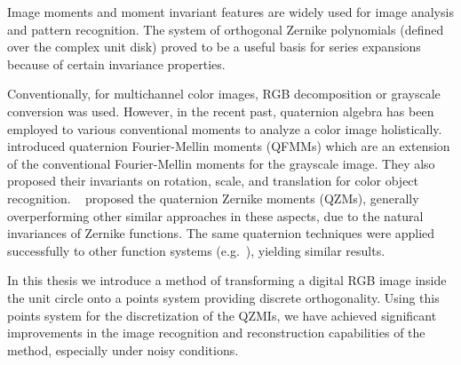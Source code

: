 Image moments and moment invariant features are widely used for image analysis and pattern recognition. The system of orthogonal Zernike polynomials (defined over the complex unit disk) proved to be a useful basis for series expansions because of certain invariance properties.

Conventionally, for multichannel color images, RGB decomposition or grayscale conversion was used. However, in the recent past, quaternion algebra has been employed to various conventional moments to analyze a color image holistically. \citeauthor{qfmm}~\cite{qfmm} introduced quaternion Fourier-Mellin moments (QFMMs) which are an extension of the conventional Fourier-Mellin moments for the grayscale image. They also proposed their invariants on rotation, scale, and translation for color object recognition. \citeauthor{qzmi}~\cite{qzmi} proposed the quaternion Zernike moments (QZMs), generally overperforming other similar approaches in these aspects, due to the natural invariances of Zernike functions. The same quaternion techniques were applied successfully to other function systems (e.g.~\cite{Shao, chebyshev-fourier}), yielding similar results.

In this thesis we introduce a method of transforming a digital RGB image inside the unit circle onto a points system providing discrete orthogonality. Using this points system for the discretization of the QZMIs, we have achieved significant improvements in the image recognition and reconstruction capabilities of the method, especially under noisy conditions.